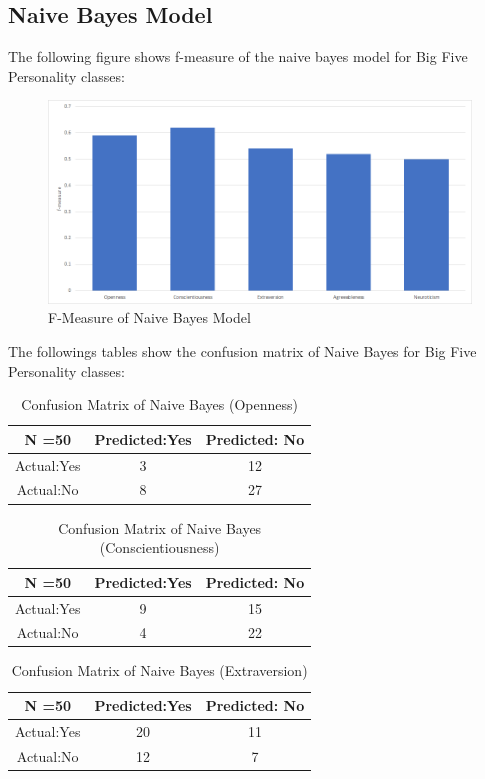 \cleardoublepage
\subsection{Naive Bayes Model}
The following figure shows f-measure of the naive bayes model for Big Five Personality classes:
\begin{figure}[!ht]
\centering
\includegraphics[width = \textwidth ]{fig/f-measure_naivebayes.png}
\caption{F-Measure of Naive Bayes Model}
\label{fig:f-measure_naivebayes}
\end{figure}

The followings tables show the confusion matrix of Naive Bayes for Big Five Personality classes:
\begin{table}[!ht]
\centering
\begin{tabular}{ |c|c|c| }
 \hline
 N =50 & Predicted:Yes & Predicted: No \\
 \hline
 Actual:Yes&3 & 12 \\
 \hline
 Actual:No&8 & 27 \\
 \hline
\end{tabular}
\caption{Confusion Matrix of Naive Bayes (Openness)}

\end{table}

\begin{table}[!ht]
\centering
\begin{tabular}{ |c|c|c| }
 \hline
 N =50 & Predicted:Yes & Predicted: No \\
 \hline
 Actual:Yes&9 & 15 \\
 \hline
 Actual:No&4 & 22 \\
 \hline
\end{tabular}
\caption{Confusion Matrix of Naive Bayes (Conscientiousness)}
\end{table}

\begin{table}[!ht]
\centering
\begin{tabular}{ |c|c|c| }
 \hline
 N =50 & Predicted:Yes & Predicted: No \\
 \hline
 Actual:Yes&20 & 11 \\
 \hline
 Actual:No&12 & 7 \\
 \hline
\end{tabular}
 \caption{Confusion Matrix of Naive Bayes (Extraversion)}
\end{table}

